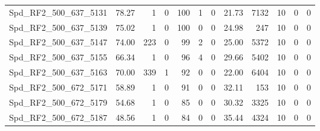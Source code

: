 \begin{longtable}[c]{@{}lrrrrrrrrrrr@{}}
Spd\_RF2\_500\_637\_5131     & 78.27                  & 1                       & 0                       & 100                    & 1                       & 0                       & 21.73                   & 7132                     & 10                       & 0                        & 0                        \\
Spd\_RF2\_500\_637\_5139     & 75.02                  & 1                       & 0                       & 100                    & 0                       & 0                       & 24.98                   & 247                      & 10                       & 0                        & 0                        \\
Spd\_RF2\_500\_637\_5147     & 74.00                  & 223                     & 0                       & 99                     & 2                       & 0                       & 25.00                   & 5372                     & 10                       & 0                        & 0                        \\
Spd\_RF2\_500\_637\_5155     & 66.34                  & 1                       & 0                       & 96                     & 4                       & 0                       & 29.66                   & 5402                     & 10                       & 0                        & 0                        \\
Spd\_RF2\_500\_637\_5163     & 70.00                  & 339                     & 1                       & 92                     & 0                       & 0                       & 22.00                   & 6404                     & 10                       & 0                        & 0                        \\
Spd\_RF2\_500\_672\_5171     & 58.89                  & 1                       & 0                       & 91                     & 0                       & 0                       & 32.11                   & 153                      & 10                       & 0                        & 0                        \\
Spd\_RF2\_500\_672\_5179     & 54.68                  & 1                       & 0                       & 85                     & 0                       & 0                       & 30.32                   & 3325                     & 10                       & 0                        & 0                        \\
Spd\_RF2\_500\_672\_5187     & 48.56                  & 1                       & 0                       & 84                     & 0                       & 0                       & 35.44                   & 4324                     & 10                       & 0                        & 0                        \\

\end{longtable}
